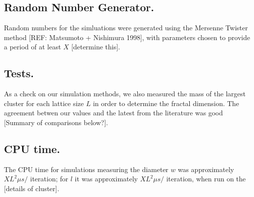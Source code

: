 \documentclass[pre,preprint,11pt]{revtex4}
\begin{document}
\subsection{ Random Number Generator.} 

Random numbers for the simluations were generated using the Mersenne Twister method [REF:  Matsumoto + Nishimura 1998], with parameters chosen to provide a period of at least $X$ [determine this].

\subsection{ Tests.}  

As a check on our simulation methods, we also measured the mass of the largest cluster for each lattice size $L$ in order to determine the fractal dimension.  The agreement betwen our values and the latest from the literature was good [Summary of comparisons below?].

\subsection{ CPU time.} 

The CPU time for simulations measuring the diameter $w$ was approximately $X L^2 \mu s /$ iteration; for $l$ it was approximately $X L^2 \mu s /$ iteration, when run on the [details of cluster].






\end{document}
